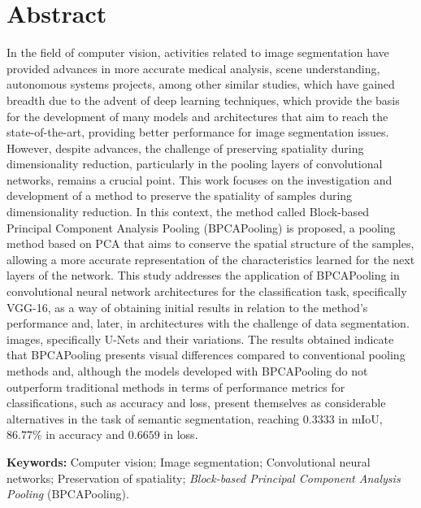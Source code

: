 \section*{Abstract}
\thispagestyle{empty}
In the field of computer vision, activities related to image segmentation have provided advances in more accurate medical analysis, scene understanding, autonomous systems projects, among other similar studies, which have gained breadth due to the advent of deep learning techniques, which provide the basis for the development of many models and architectures that aim to reach the state-of-the-art, providing better performance for image segmentation issues.
However, despite advances, the challenge of preserving spatiality during dimensionality reduction, particularly in the pooling layers of convolutional networks, remains a crucial point. This work focuses on the investigation and development of a method to preserve the spatiality of samples during dimensionality reduction. In this context, the method called Block-based Principal Component Analysis Pooling (BPCAPooling) is proposed, a pooling method based on PCA that aims to conserve the spatial structure of the samples, allowing a more accurate representation of the characteristics learned for the next layers of the network.
This study addresses the application of BPCAPooling in convolutional neural network architectures for the classification task, specifically VGG-16, as a way of obtaining initial results in relation to the method's performance and, later, in architectures with the challenge of data segmentation. images, specifically U-Nets and their variations. The results obtained indicate that BPCAPooling presents visual differences compared to conventional pooling methods and, although the models developed with BPCAPooling do not outperform traditional methods in terms of performance metrics for classifications, such as accuracy and loss, present themselves as considerable alternatives in the task of semantic segmentation, reaching $0.3333$ in mIoU, $86.77\%$ in accuracy and $0.6659$ in loss.

\textbf{Keywords:} Computer vision; Image segmentation; Convolutional neural networks; Preservation of spatiality; \textit{Block-based Principal Component Analysis Pooling} (BPCAPooling).